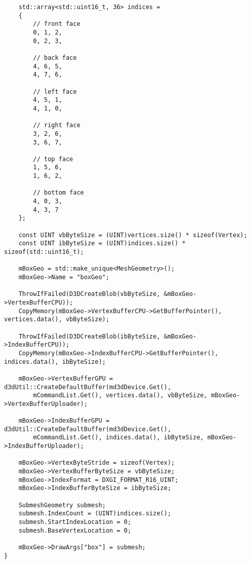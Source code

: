 \begin{lstlisting}
    std::array<std::uint16_t, 36> indices =
    {
        // front face
        0, 1, 2,
        0, 2, 3,

        // back face
        4, 6, 5,
        4, 7, 6,

        // left face
        4, 5, 1,
        4, 1, 0,

        // right face
        3, 2, 6,
        3, 6, 7,

        // top face
        1, 5, 6,
        1, 6, 2,

        // bottom face
        4, 0, 3,
        4, 3, 7
    };

    const UINT vbByteSize = (UINT)vertices.size() * sizeof(Vertex);
    const UINT ibByteSize = (UINT)indices.size() * sizeof(std::uint16_t);

    mBoxGeo = std::make_unique<MeshGeometry>();
    mBoxGeo->Name = "boxGeo";

    ThrowIfFailed(D3DCreateBlob(vbByteSize, &mBoxGeo->VertexBufferCPU));
    CopyMemory(mBoxGeo->VertexBufferCPU->GetBufferPointer(), vertices.data(), vbByteSize);

    ThrowIfFailed(D3DCreateBlob(ibByteSize, &mBoxGeo->IndexBufferCPU));
    CopyMemory(mBoxGeo->IndexBufferCPU->GetBufferPointer(), indices.data(), ibByteSize);

    mBoxGeo->VertexBufferGPU = d3dUtil::CreateDefaultBuffer(md3dDevice.Get(),
        mCommandList.Get(), vertices.data(), vbByteSize, mBoxGeo->VertexBufferUploader);

    mBoxGeo->IndexBufferGPU = d3dUtil::CreateDefaultBuffer(md3dDevice.Get(),
        mCommandList.Get(), indices.data(), ibByteSize, mBoxGeo->IndexBufferUploader);

    mBoxGeo->VertexByteStride = sizeof(Vertex);
    mBoxGeo->VertexBufferByteSize = vbByteSize;
    mBoxGeo->IndexFormat = DXGI_FORMAT_R16_UINT;
    mBoxGeo->IndexBufferByteSize = ibByteSize;

    SubmeshGeometry submesh;
    submesh.IndexCount = (UINT)indices.size();
    submesh.StartIndexLocation = 0;
    submesh.BaseVertexLocation = 0;

    mBoxGeo->DrawArgs["box"] = submesh;
}


\end{lstlisting}
